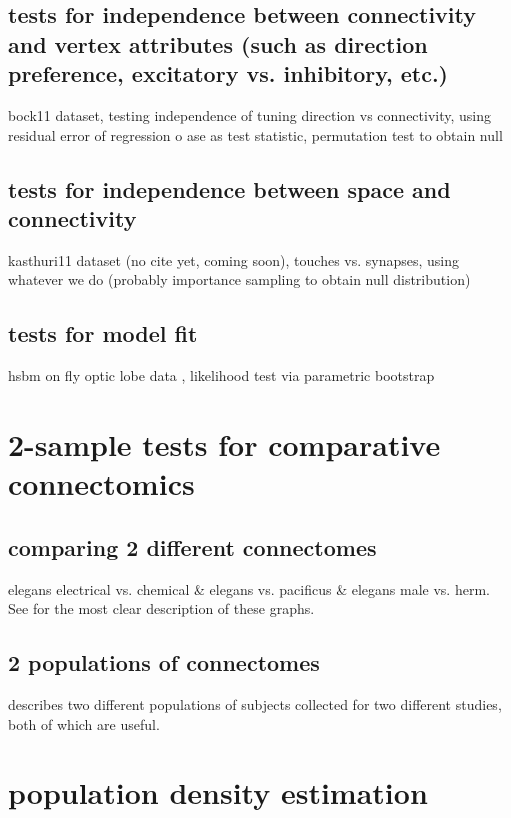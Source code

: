 \documentclass[final,leqno]{article}
\begin{document}
\subsection{tests for independence between connectivity and vertex attributes (such as direction preference, excitatory vs. inhibitory, etc.)}

bock11 \cite{Bock2011} dataset, testing independence of tuning direction vs connectivity, using residual error of regression o ase as test statistic, permutation test to obtain null

\subsection{tests for independence between space and connectivity}

kasthuri11 dataset (no cite yet, coming soon), touches vs. synapses, using whatever we do (probably importance sampling to obtain null distribution)


\subsection{tests for model fit}

hsbm on fly optic lobe data \cite{Takemura2013}, likelihood test via parametric bootstrap

\section{2-sample tests for comparative connectomics}

\subsection{comparing 2 different connectomes}

elegans electrical vs. chemical \& elegans vs. pacificus \& elegans male vs. herm.  See \cite{Varshney2011} for the most clear description of these graphs.


\subsection{2 populations of connectomes}

\cite{Nooner2012,Landman2010} describes two different populations of subjects collected for two different studies, both of which are useful.

\section{population density estimation}
\end{document}
